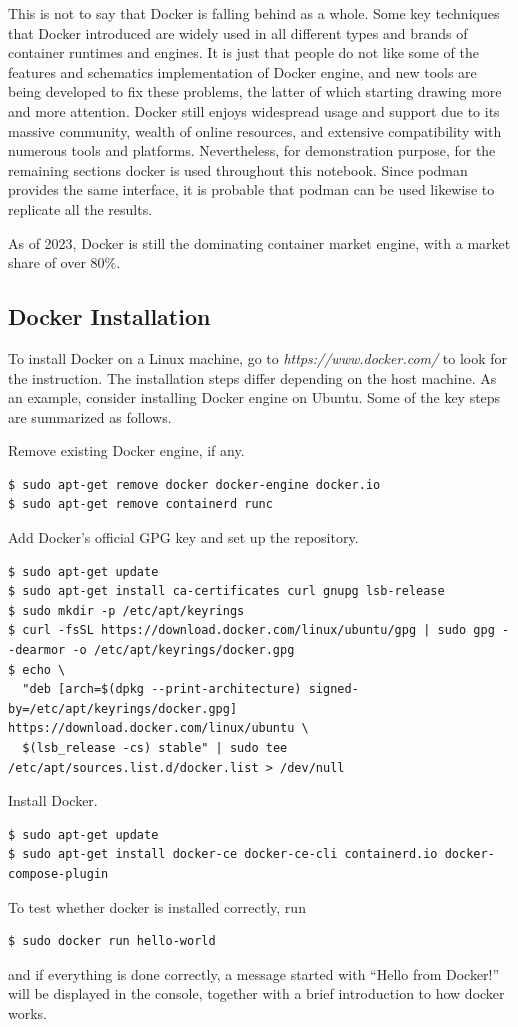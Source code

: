 This is not to say that Docker is falling behind as a whole. Some key techniques that Docker introduced are widely used in all different types and brands of container runtimes and engines. It is just that people do not like some of the features and schematics implementation of Docker engine, and new tools are being developed to fix these problems, the latter of which starting drawing more and more attention. Docker still enjoys widespread usage and support due to its massive community, wealth of online resources, and extensive compatibility with numerous tools and platforms. Nevertheless, for demonstration purpose, for the remaining sections docker is used throughout this notebook. Since podman provides the same interface, it is probable that podman can be used likewise to replicate all the results.

As of 2023, Docker is still the dominating container market engine, with a market share of over $80\%$.

\subsection{Docker Installation}

To install Docker on a Linux machine, go to \textit{https://www.docker.com/} to look for the instruction. The installation steps differ depending on the host machine. As an example, consider installing Docker engine on Ubuntu. Some of the key steps are summarized as follows.

Remove existing Docker engine, if any.
\begin{lstlisting}
$ sudo apt-get remove docker docker-engine docker.io
$ sudo apt-get remove containerd runc
\end{lstlisting}
Add Docker's official GPG key and set up the repository.
\begin{lstlisting}
$ sudo apt-get update
$ sudo apt-get install ca-certificates curl gnupg lsb-release
$ sudo mkdir -p /etc/apt/keyrings
$ curl -fsSL https://download.docker.com/linux/ubuntu/gpg | sudo gpg --dearmor -o /etc/apt/keyrings/docker.gpg
$ echo \
  "deb [arch=$(dpkg --print-architecture) signed-by=/etc/apt/keyrings/docker.gpg] https://download.docker.com/linux/ubuntu \
  $(lsb_release -cs) stable" | sudo tee /etc/apt/sources.list.d/docker.list > /dev/null
\end{lstlisting}
Install Docker.
\begin{lstlisting}
$ sudo apt-get update
$ sudo apt-get install docker-ce docker-ce-cli containerd.io docker-compose-plugin
\end{lstlisting}
To test whether docker is installed correctly, run
\begin{lstlisting}
$ sudo docker run hello-world
\end{lstlisting}
and if everything is done correctly, a message started with ``Hello from Docker!'' will be displayed in the console, together with a brief introduction to how docker works.

